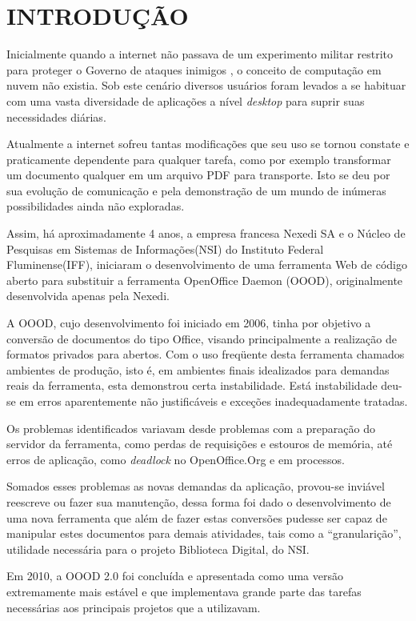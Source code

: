 \chapter{INTRODUÇÃO}
\thispagestyle{empty}

Inicialmente quando a internet não passava de um experimento militar restrito para proteger o Governo de ataques inimigos \cite{TESLA}, o conceito de computação em nuvem não existia. Sob este cenário diversos usuários foram levados a se habituar com uma vasta diversidade de aplicações a nível \textit{desktop} para suprir suas necessidades diárias.

Atualmente a internet sofreu tantas modificações que seu uso se tornou constate e praticamente dependente para qualquer tarefa, como por exemplo transformar um documento qualquer em um arquivo PDF para transporte. Isto se deu por sua evolução de comunicação e pela demonstração de um mundo de inúmeras possibilidades ainda não exploradas.

Assim, há aproximadamente 4 anos, a empresa francesa Nexedi SA e o Núcleo de Pesquisas em Sistemas de Informações(NSI) do Instituto Federal Fluminense(IFF), iniciaram o desenvolvimento de uma ferramenta Web de código aberto para substituir a ferramenta OpenOffice Daemon (OOOD), originalmente desenvolvida apenas pela Nexedi.

A OOOD, cujo desenvolvimento foi iniciado em 2006, tinha por objetivo a conversão de documentos do tipo Office, visando principalmente a realização de formatos privados para abertos. Com o uso freqüente desta ferramenta chamados ambientes de produção, isto é, em ambientes finais idealizados para demandas reais da ferramenta, esta demonstrou certa instabilidade. Está instabilidade deu-se em erros aparentemente não justificáveis e exceções inadequadamente tratadas.

Os problemas identificados variavam desde problemas com a preparação do servidor da ferramenta, como perdas de requisições e estouros de memória, até erros de aplicação, como \textit{deadlock} no OpenOffice.Org e em processos.

Somados esses problemas as novas demandas da aplicação, provou-se inviável reescreve ou fazer sua manutenção, dessa forma foi dado o desenvolvimento de uma nova ferramenta que além de fazer estas conversões pudesse ser capaz de manipular estes documentos para demais atividades, tais como a ``granularição'', utilidade necessária para o projeto Biblioteca Digital, do NSI.

Em 2010, a OOOD 2.0 foi concluída e apresentada como uma versão extremamente mais estável e que implementava grande parte das tarefas necessárias aos principais projetos que a utilizavam. 

